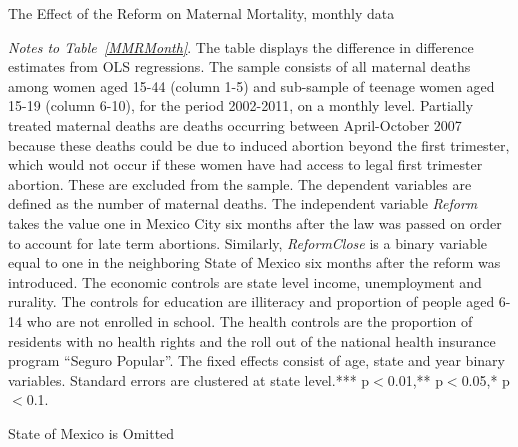\documentclass[a4paper, 11pt]{article}
\begin{document}
\begin{spacing}{1.4}
\begin{table}\caption{The Effect of the Reform on Maternal Mortality, monthly data} \label{MMRMonth}
  \begin{threeparttable}
    {\footnotesize  }
    \begin{tablenotes}
      \footnotesize
    \item \textit{Notes to Table~\ref{MMRMonth}}. The table displays the difference in difference estimates from OLS regressions. The sample consists of all maternal deaths among women aged 15-44 (column 1-5) and sub-sample of teenage women aged 15-19 (column 6-10), for the period 2002-2011, on a monthly level. Partially treated maternal deaths are deaths occurring between April-October 2007 because these deaths could be due to induced abortion beyond the first trimester, which would not occur if these women have had access to legal first trimester abortion. These are excluded from the sample. The dependent variables are defined as the number of maternal deaths. The independent variable \textit{Reform} takes the value one in Mexico City six months after the law was passed on order to account for late term abortions. Similarly, \textit{ReformClose} is a binary variable equal to one in the neighboring State of Mexico six months after the reform was introduced. The economic controls are state level income, unemployment and rurality. The controls for education are illiteracy and proportion of people aged 6-14 who are not enrolled in school. The health controls are the proportion of residents with no health rights and the roll out of the national health insurance program ``Seguro Popular''. The fixed effects consist of age, state and year binary variables. Standard errors are clustered at state level.*** p$<$0.01,** p$<$0.05,* p$<$0.1.
    \end{tablenotes} 
  \end{threeparttable}
\end{table}


\begin{table}\centering  \caption{State of Mexico is Omitted} \label{robust_reg:a}
  \begin{threeparttable}
    {\footnotesize 	}
 

\end{threeparttable}
\end{table}
\end{spacing}
\end{document}
